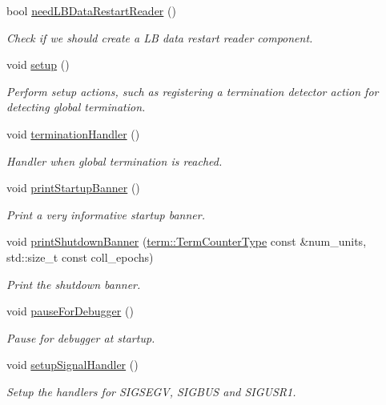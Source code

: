\begin{DoxyCompactItemize}
bool \hyperlink{structvt_1_1runtime_1_1_runtime_a494534b0e9e9fcbb10262442d7e427c9}{need\+L\+B\+Data\+Restart\+Reader} ()
\begin{DoxyCompactList}\small\item\em Check if we should create a LB data restart reader component. \end{DoxyCompactList}\item 
void \hyperlink{structvt_1_1runtime_1_1_runtime_a1c4fda11afb43bb2607cd1f00686550c}{setup} ()
\begin{DoxyCompactList}\small\item\em Perform setup actions, such as registering a termination detector action for detecting global termination. \end{DoxyCompactList}\item 
void \hyperlink{structvt_1_1runtime_1_1_runtime_a2d12f2a97d99585ef8e89cda0ed48972}{termination\+Handler} ()
\begin{DoxyCompactList}\small\item\em Handler when global termination is reached. \end{DoxyCompactList}\item 
void \hyperlink{structvt_1_1runtime_1_1_runtime_add9fabaf1c2f47ebf9c662f4b5f5931f}{print\+Startup\+Banner} ()
\begin{DoxyCompactList}\small\item\em Print a very informative startup banner. \end{DoxyCompactList}\item 
void \hyperlink{structvt_1_1runtime_1_1_runtime_a04efbdc6b8826e2c885987279a4762f1}{print\+Shutdown\+Banner} (\hyperlink{namespacevt_1_1term_a4fd378cdb0c36683afc1b3399d685f7f}{term\+::\+Term\+Counter\+Type} const \&num\+\_\+units, std\+::size\+\_\+t const coll\+\_\+epochs)
\begin{DoxyCompactList}\small\item\em Print the shutdown banner. \end{DoxyCompactList}\item 
void \hyperlink{structvt_1_1runtime_1_1_runtime_afb151608d12de9a50ce037d5e8896e99}{pause\+For\+Debugger} ()
\begin{DoxyCompactList}\small\item\em Pause for debugger at startup. \end{DoxyCompactList}\item 
void \hyperlink{structvt_1_1runtime_1_1_runtime_af87ef11218f0c1d095dcdcd4cfe4521e}{setup\+Signal\+Handler} ()
\begin{DoxyCompactList}\small\item\em Setup the handlers for S\+I\+G\+S\+E\+GV, S\+I\+G\+B\+US and S\+I\+G\+U\+S\+R1. \end{DoxyCompactList}\item 

\end{DoxyCompactItemize}
